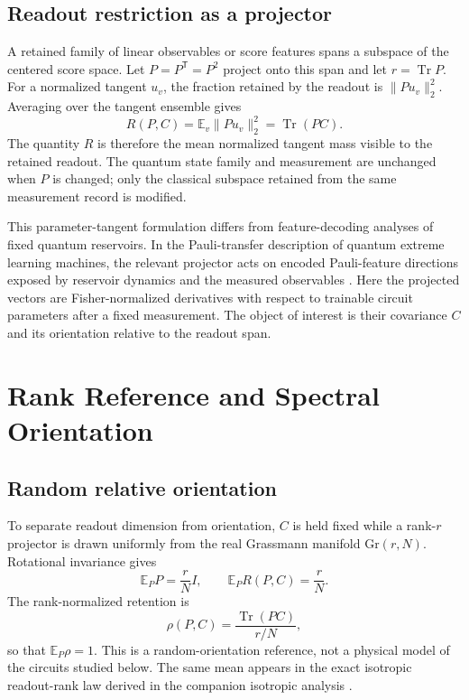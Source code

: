 \subsection{Readout restriction as a projector}

A retained family of linear observables or score features spans a subspace of the centered score space. Let $P=P^{\mathsf T}=P^2$ project onto this span and let $r=\operatorname{Tr}P$. For a normalized tangent $u_v$, the fraction retained by the readout is $\|Pu_v\|_2^2$. Averaging over the tangent ensemble gives
\begin{equation}
 R(P,C)=\mathbb E_v\|Pu_v\|_2^2
       =\operatorname{Tr}(PC).
\label{eq:aqt-retention}
\end{equation}
The quantity $R$ is therefore the mean normalized tangent mass visible to the retained readout. The quantum state family and measurement are unchanged when $P$ is changed; only the classical subspace retained from the same measurement record is modified.

This parameter-tangent formulation differs from feature-decoding analyses of fixed quantum reservoirs. In the Pauli-transfer description of quantum extreme learning machines, the relevant projector acts on encoded Pauli-feature directions exposed by reservoir dynamics and the measured observables \cite{GrossRieser2026}. Here the projected vectors are Fisher-normalized derivatives with respect to trainable circuit parameters after a fixed measurement. The object of interest is their covariance $C$ and its orientation relative to the readout span.

\section{Rank Reference and Spectral Orientation}

\subsection{Random relative orientation}

To separate readout dimension from orientation, $C$ is held fixed while a rank-$r$ projector is drawn uniformly from the real Grassmann manifold $\mathrm{Gr}(r,N)$. Rotational invariance gives
\begin{equation}
 \mathbb E_P P=\frac{r}{N}I,
 \qquad
 \mathbb E_P R(P,C)=\frac{r}{N}.
\end{equation}
The rank-normalized retention is
\begin{equation}
 \rho(P,C)=\frac{\operatorname{Tr}(PC)}{r/N},
\label{eq:aqt-rho}
\end{equation}
so that $\mathbb E_P\rho=1$. This is a random-orientation reference, not a physical model of the circuits studied below. The same mean appears in the exact isotropic readout-rank law derived in the companion isotropic analysis \cite{AitHaddou2026IsotropicRankLaws}.

